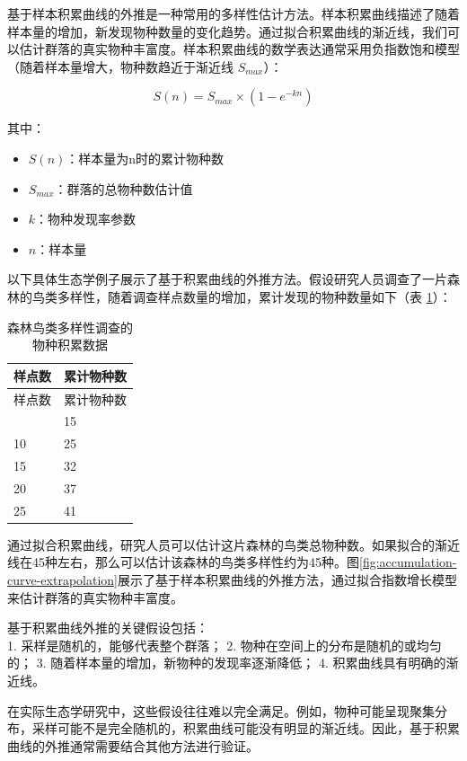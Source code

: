 \documentclass[
  twoside,12pt,fontset=none]{ctexbook}
\providecommand{\tightlist}{%
  \setlength{\itemsep}{0pt}\setlength{\parskip}{0pt}}
\begin{document}
基于样本积累曲线的外推是一种常用的多样性估计方法。样本积累曲线描述了随着样本量的增加，新发现物种数量的变化趋势。通过拟合积累曲线的渐近线，我们可以估计群落的真实物种丰富度。样本积累曲线的数学表达通常采用负指数饱和模型（随着样本量增大，物种数趋近于渐近线 \(S_{max}\)）：

\[S(n) = S_{max} \times (1 - e^{-kn})\]

其中：

\begin{itemize}
\tightlist
\item
  \(S(n)\)：样本量为n时的累计物种数
\item
  \(S_{max}\)：群落的总物种数估计值
\item
  \(k\)：物种发现率参数
\item
  \(n\)：样本量
\end{itemize}

以下具体生态学例子展示了基于积累曲线的外推方法。假设研究人员调查了一片森林的鸟类多样性，随着调查样点数量的增加，累计发现的物种数量如下（表 \ref{tab:bird-species-accumulation}）：

\begin{longtable}[]{@{}ll@{}}
\caption{\label{tab:bird-species-accumulation} 森林鸟类多样性调查的物种积累数据}\tabularnewline
\toprule\noalign{}
样点数 & 累计物种数 \\
\midrule\noalign{}
\endfirsthead
\toprule\noalign{}
样点数 & 累计物种数 \\
\midrule\noalign{}
\endhead
\bottomrule\noalign{}
\endlastfoot
5 & 15 \\
10 & 25 \\
15 & 32 \\
20 & 37 \\
25 & 41 \\
\end{longtable}

通过拟合积累曲线，研究人员可以估计这片森林的鸟类总物种数。如果拟合的渐近线在45种左右，那么可以估计该森林的鸟类多样性约为45种。图\ref{fig:accumulation-curve-extrapolation}展示了基于样本积累曲线的外推方法，通过拟合指数增长模型来估计群落的真实物种丰富度。

基于积累曲线外推的关键假设包括：\\
1. 采样是随机的，能够代表整个群落；
2. 物种在空间上的分布是随机的或均匀的；
3. 随着样本量的增加，新物种的发现率逐渐降低；
4. 积累曲线具有明确的渐近线。

在实际生态学研究中，这些假设往往难以完全满足。例如，物种可能呈现聚集分布，采样可能不是完全随机的，积累曲线可能没有明显的渐近线。因此，基于积累曲线的外推通常需要结合其他方法进行验证。
\end{document}
